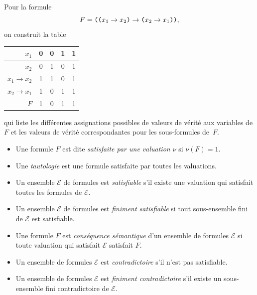 \documentclass[./main]{subfiles}
\begin{document}
  \begin{exm}
    Pour la formule \[F = \verb|((|x_1\to x_2\verb|)| \to \verb|(|x_2 \to x_1\verb|))|, \] on construit la table 
    \begin{table}[H]
      \centering
      \begin{tabular}{r|cccc}
        $x_1$ & 0 & 0 & 1 & 1\\ \hline
        $x_2$ & 0 & 1 & 0 & 1\\ \hline
        $x_1 \to x_2$ & 1 & 1 & 0 & 1\\ \hline
        $x_2 \to x_1$ & 1 & 0 & 1 & 1\\ \hline
        $F$ & 1 & 0 & 1 & 1
      \end{tabular}
    \end{table}
    qui liste les différentes assignations possibles de valeurs de vérité aux variables de $F$ et les valeurs de vérité correspondantes pour les sous-formules de~$F$.
  \end{exm}

  \begin{defn}
    \begin{itemize}
      \item Une formule $F$ est dite \textit{satisfaite par une valuation $\nu$} si  $\nu(F) = 1$.
      \item Une \textit{tautologie} est une formule satisfaite par toutes les valuations.
      \item Un ensemble $\mathcal{E}$ de formules est \textit{satisfiable} s'il existe une valuation qui satisfait toutes les formules de $\mathcal{E}$.
      \item Un ensemble $\mathcal{E}$ de formules est \textit{finiment satisfiable} si tout sous-ensemble fini de $\mathcal{E}$ est satisfiable.
      \item Une formule $F$ est \textit{conséquence sémantique} d'un ensemble de formules $\mathcal{E}$ si toute valuation qui satisfait $\mathcal{E}$ satisfait $F$.
      \item Un ensemble de formules $\mathcal{E}$ est \textit{contradictoire} s'il n'est pas satisfiable.
      \item Un ensemble de formules $\mathcal{E}$ est \textit{finiment contradictoire} s'il existe un sous-ensemble fini contradictoire de $\mathcal{E}$.
    \end{itemize}
  \end{defn}
\end{document}
